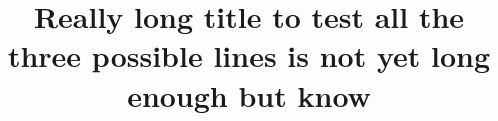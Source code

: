 \documentclass[t]{beamer}
\title{Really long title to test all the three possible lines is not yet long enough but know}
\begin{document}
    \begin{frame}[t]
    \end{frame}

    \begin{frame}[t]
            \begin{minipage}[b][0mm][t]{85mm}%
            \end{minipage}%
    \end{frame}

  
\end{document}
